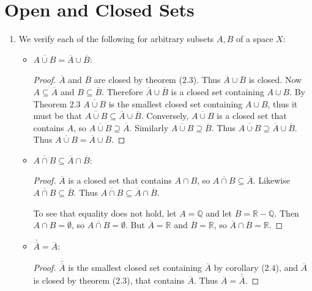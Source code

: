 \documentclass{book}
\begin{document}
\section{Open and Closed Sets}
\begin{enumerate}[(1)]

    \item We verify each of the following for arbitrary subsets $A,B$ of a space $X$:
        \begin{itemize}
            \item $\overline{A\cup B}=\overline{A}\cup \overline{B}$:
                \begin{proof} $\overline{A}$ and $\overline{B}$ are closed by theorem ($2.3$).  Thus $\overline{A} \cup \overline{B}$ is closed.  Now $A\subseteq \overline{A}$ and $B\subseteq \overline{B}$.  Therefore $\overline{A} \cup \overline{B}$ is a closed set containing $A\cup B$.  By Theorem 2.3 $\overline{A\cup B}$ is the smallest closed set containing $A\cup B$, thus it must be that $\overline{A\cup B}\subseteq \overline{A}\cup \overline{B}$.  Conversely, $\overline{A\cup B}$ is a closed set that contains $A$, so $\overline{A\cup B}\supseteq\overline{A}$.  Similarly $\overline{A\cup B}\supseteq\overline{B}$.  Thus $\overline{A\cup B}\supseteq\overline{A}\cup\overline{B}$.  Thus $\overline{A\cup B}=\overline{A}\cup\overline{B}$.
                \end{proof}

            \item $\overline{A\cap B} \subseteq \overline{A}\cap \overline{B}$:
                \begin{proof} $\overline{A}$ is a closed set that contains $A\cap B$, so $\overline{A\cap B}\subseteq\overline{A}$.   Likewise $\overline{A\cap B}\subseteq\overline{B}$.  Thus $\overline{A\cap B}\subseteq\overline{A}\cap\overline{B}$.
                    \par To see that equality does not hold, let $A=\mathbb Q$ and let $B=\mathbb R - \mathbb Q$.  Then $A\cap B=\emptyset$, so $\overline{A\cap B}=\emptyset$.  But $\overline{A}=\mathbb R$ and $\overline{B}=\mathbb R$, so $\overline{A}\cap \overline{B}=\mathbb R$.
                \end{proof}

            \item $\bar{\overline{A}}=\overline{A}$:
                \begin{proof} $\bar{\overline{A}}$ is the smallest closed set containing $\overline{A}$ by corollary ($2.4$), and $\overline{A}$ is closed by theorem ($2.3$), that contains $\overline{A}$.  Thus $\overline{A}=\bar{\overline{A}}$.
                \end{proof}


\end{itemize}
\end{enumerate}
\end{document}
